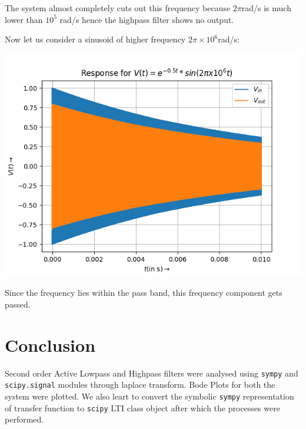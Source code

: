 \documentclass[12pt, a4paper]{report}
\begin{document}
The system almost completely cuts out this frequency because $2 \pi$rad/s is much lower than $10^5$ rad/s hence the highpass filter shows no output. 

Now let us consider a sinusoid of higher frequency $2\pi \times 10^6$rad/s:

\begin{center}
	\includegraphics[scale=0.72]{Figure6.png} 
	\label{fig:rawdata}
\end{center}
Since the frequency lies within the pass band, this frequency component gets passed. 

\section*{Conclusion}

Second order Active Lowpass and Highpass filters were analysed using \texttt{sympy} and \texttt{scipy.signal} modules through laplace transform. Bode Plots for both the system were plotted. We also leart to convert the symbolic \texttt{sympy} representation of transfer function to \texttt{scipy} LTI class object after which the processes were performed.  
\end{document}
